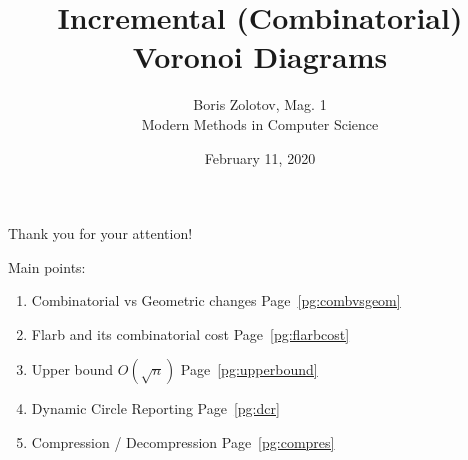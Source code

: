 \documentclass[aspectratio=169,12pt,notheorems]{beamer}
\title[Incremental Voronoi Diagrams]
	{\bfseries Incremental (Combinatorial)
	     Voronoi Diagrams}
\author[\ ]
	{Boris Zolotov, Mag. 1 \\ \vspace{0.3cm}
		{\small Modern Methods in Computer Science}}
\institute[\ ]{\ }
\date{February 11, 2020}
\theoremstyle{plain}
\theoremstyle{definition}
\begin{document}
\def\mC{\mathcal C} \def\mF{\mathcal F}
\def\mE{\mathcal E} \def\mG{\mathcal G}

\frame{\titlepage}







\begin{frame} \begin{center} \vspace{0.5cm}
	{\Huge Thank you for your attention!} \\ [1cm]
\end{center}

Main points: \medskip

\begin{enumerate}
	\item Combinatorial vs Geometric changes \hfill Page~\ref{pg:combvsgeom}
	\item Flarb and its combinatorial cost \hfill Page~\ref{pg:flarbcost}
	\item Upper bound $O(\sqrt{n})$ \hfill Page~\ref{pg:upperbound}
	\item Dynamic Circle Reporting \hfill Page~\ref{pg:dcr}
	\item Compression / Decompression \hfill Page~\ref{pg:compres}
\end{enumerate}
\end{frame}
\end{document}
